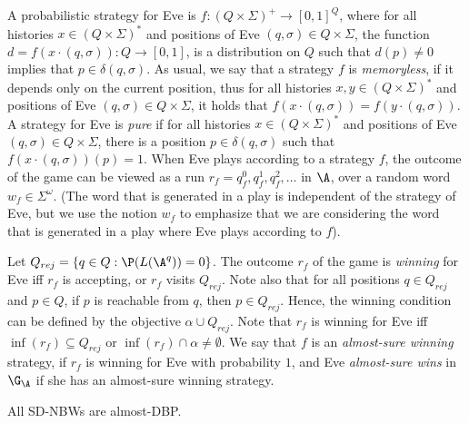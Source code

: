 \documentclass{lmcs}
\begin{document}
\noindent %
A probabilistic strategy for Eve is $f:(Q\times\Sigma)^+\rightarrow [0,1]^Q$, where for all histories $x\in (Q\times\Sigma)^*$ and positions of Eve $(q,\sigma)\in Q\times \Sigma$, the function $d=f(x\cdot (q,\sigma)):Q\rightarrow[0,1]$, is a distribution on $Q$ such that $d(p)\neq 0$ implies that $p\in \delta(q,\sigma)$. As usual, we say that a strategy $f$ is {\em memoryless\/}, if it depends only on the current position, thus for all histories $x,y\in (Q\times \Sigma)^*$ and positions of Eve $(q,\sigma)\in Q\times \Sigma$, it holds that $f(x\cdot (q,\sigma))=f(y\cdot (q,\sigma))$. A strategy for Eve is {\em pure\/} if for all histories $x\in (Q\times \Sigma)^*$ and positions of Eve $(q,\sigma)\in Q\times \Sigma$, there is a position $p\in \delta(q,\sigma)$ such that $f(x\cdot(q,\sigma))(p)=1$. When Eve plays according to a strategy $f$, the outcome of the game can be viewed as a run $r_f=q_f^0,q_f^1,q_f^2,\ldots$ in $\A$, over a random word $w_f\in \Sigma^\omega$. (The word that is generated in a play is independent of the strategy of Eve, but we use the notion $w_f$ to emphasize that we are considering the word that is generated in a play where Eve plays according to $f$). 

Let $Q_{rej}=\{q\in Q : \P(L(\A^q))=0\}$.
The outcome $r_f$ of the game is {\em winning\/} for Eve iff $r_f$ is accepting, or $r_f$ visits $Q_{rej}$. Note also that for all positions $q\in Q_{rej}$ and $p\in Q$, if $p$ is reachable from $q$, then $p\in Q_{rej}$. Hence, the winning condition can be defined by the \buchi objective $\alpha\cup Q_{rej}$. Note that $r_f$ is winning for Eve iff $\inf(r_f)\subseteq Q_{rej}$ or $\inf(r_f)\cap \alpha \neq \emptyset$. 
We say that $f$ is an {\em almost-sure winning\/} strategy, if $r_f$ is winning for Eve with probability $1$, and Eve {\em almost-sure wins} in $\G_\A$ if she has an almost-sure winning strategy.


\begin{thm}
\label{sd-nbw almost}
All SD-NBWs are almost-DBP.
\end{thm}
\end{document}
